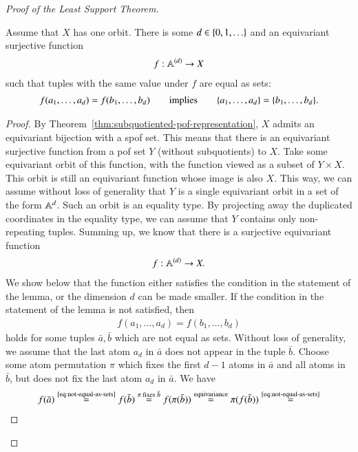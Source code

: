 \begin{proof}[Proof of the Least Support Theorem]
\begin{lemma}\label{lem:tuple-as-set}
    Assume that $X$ has one orbit. There is some $d \in \{0,1,\ldots\}$ and an equivariant surjective function
 \begin{align*}
 f : \mathbb A^{(d)} \to X 
 \end{align*}
 such that tuples with the same value under $f$ are equal as sets:
 \begin{align*}
 f(a_1,\ldots,a_d) = f(b_1,\ldots,b_d) \qquad \text{implies} \qquad \{a_1,\ldots,a_d\}= \{b_1,\ldots,b_d\}.
 \end{align*}
\end{lemma}
\begin{proof}
 By Theorem~\ref{thm:subquotiented-pof-representation}, $X$ admits an equivariant bijection with a spof set. This means that there is an equivariant surjective function from a  pof set $Y$ (without subquotients) to $X$. 
 Take some equivariant orbit of this function, with the function viewed as a subset of $Y \times X$. This orbit is still an equivariant function whose image is also $X$. This way, we can assume without loss of generality that $Y$ is a single equivariant orbit in a set of the form $\mathbb A^d$. Such an orbit is an equality type. By projecting away the duplicated coordinates in the equality type, we can assume that $Y$ contains only non-repeating tuples. Summing up, we know that there is a surjective equivariant function
 \begin{align*}
 f : \mathbb A^{(d)} \to X.
 \end{align*}
 We show below that the function either satisfies the condition in the statement of the lemma, or the dimension $d$ can be made smaller. If the condition in the statement of the lemma is not satisfied, then 
 \begin{align}\label{eq:not-equal-as-sets}
 f(a_1,\ldots,a_d) = f(b_1,\ldots,b_d) 
 \end{align}
 holds for some tuples $\bar a, \bar b$ which are not equal as sets. Without loss of generality, we assume that the last atom $a_d$ in $\bar a$ does not appear in the tuple $\bar b$. Choose some 
 atom permutation $\pi$ which fixes the first $d-1$ atoms in $\bar a$ and all atoms in $\bar b$, but does not fix the last atom $a_d$ in $\bar a$. We have 
 \begin{eqnarray*}
 f(\bar a) \stackrel{\text{\eqref{eq:not-equal-as-sets}}} =
 f(\bar b) \stackrel{\text{$\pi$ fixes $\bar b$}} = 
 f(\pi(\bar b))\stackrel{\text{equivariance}} = 
 \pi(f(\bar b)) \stackrel{\text{\eqref{eq:not-equal-as-sets}}} = 

\end{eqnarray*}
\end{proof}
\end{proof}
